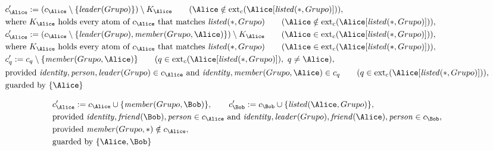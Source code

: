 \begin{align*}
&
c'_
{
\Alice
}
 := 
(c_
{
\Alice
}
 \setminus 
\{
\mathit{\detokenize{
leader
}}
(
Grupo
)
\}
) \setminus K_
{
\Alice
}
 \qquad (
\Alice
 \notin 
\mathrm{ext}_c(
\Alice
[
\mathit{\detokenize{
listed
}}
(
\ast
,
Grupo
)
]
)
)
,\\
&
\text{where } K_
{
\Alice
}
 \text{ holds every atom of } c_
{
\Alice
}
 \text{ that matches } 
\mathit{\detokenize{
listed
}}
(
\ast
,
Grupo
)
 \qquad (
\Alice
 \notin 
\mathrm{ext}_c(
\Alice
[
\mathit{\detokenize{
listed
}}
(
\ast
,
Grupo
)
]
)
)
,\\
&
c'_
{
\Alice
}
 := 
(c_
{
\Alice
}
 \setminus 
\{
\mathit{\detokenize{
leader
}}
(
Grupo
)
,
\mathit{\detokenize{
member
}}
(
Grupo
,
\Alice
)
\}
) \setminus K_
{
\Alice
}
 \qquad (
\Alice
 \in 
\mathrm{ext}_c(
\Alice
[
\mathit{\detokenize{
listed
}}
(
\ast
,
Grupo
)
]
)
)
,\\
&
\text{where } K_
{
\Alice
}
 \text{ holds every atom of } c_
{
\Alice
}
 \text{ that matches } 
\mathit{\detokenize{
listed
}}
(
\ast
,
Grupo
)
 \qquad (
\Alice
 \in 
\mathrm{ext}_c(
\Alice
[
\mathit{\detokenize{
listed
}}
(
\ast
,
Grupo
)
]
)
)
,\\
&
c'_
q
 := 
c_
q
 \setminus 
\{
\mathit{\detokenize{
member
}}
(
Grupo
,
\Alice
)
\}
 \qquad (
q
 \in 
\mathrm{ext}_c(
\Alice
[
\mathit{\detokenize{
listed
}}
(
\ast
,
Grupo
)
]
)
,\ 
q \neq 
\Alice
)
,\\
&
\text{provided } 
\mathit{\detokenize{
identity
}}
,
\mathit{\detokenize{
person
}}
,
\mathit{\detokenize{
leader
}}
(
Grupo
)
 \in c_
{
\Alice
}
 \text{ and } 
\mathit{\detokenize{
identity
}}
,
\mathit{\detokenize{
member
}}
(
Grupo
,
\Alice
)
 \in c_
q
 \qquad (
q \in 
\mathrm{ext}_c(
\Alice
[
\mathit{\detokenize{
listed
}}
(
\ast
,
Grupo
)
]
)
)
,\\
&
\text{guarded by } \{
\Alice
\}
\end{align*}

\begin{align*}
&
c'_
{
\Alice
}
 := 
c_
{
\Alice
}
 \cup 
\{
\mathit{\detokenize{
member
}}
(
Grupo
,
\Bob
)
\}
, \qquad 
c'_
{
\Bob
}
 := 
c_
{
\Bob
}
 \cup 
\{
\mathit{\detokenize{
listed
}}
(
\Alice
,
Grupo
)
\}
,\\
&
\text{provided } 
\mathit{\detokenize{
identity
}}
,
\mathit{\detokenize{
friend
}}
(
\Bob
)
,
\mathit{\detokenize{
person
}}
 \in c_
{
\Alice
}
 \text{ and } 
\mathit{\detokenize{
identity
}}
,
\mathit{\detokenize{
leader
}}
(
Grupo
)
,
\mathit{\detokenize{
friend
}}
(
\Alice
)
,
\mathit{\detokenize{
person
}}
 \in c_
{
\Bob
}
,\\
&
\text{provided } 
\mathit{\detokenize{
member
}}
(
Grupo
,
\ast
)
 \notin c_
{
\Alice
}
,\\
&
\text{guarded by } \{
\Alice
,
\Bob
\}
\end{align*}
